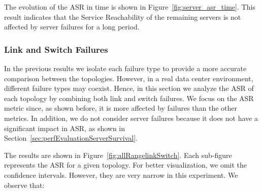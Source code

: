 The evolution of the ASR in time is shown in Figure~\ref{fig:server_asr_time}. This result indicates that the Service Reachability of the remaining servers is not affected by server failures for a long period.

\subsubsection{Link and Switch Failures}
\label{sec:perfEvaluationLinkSwitchSurvival}

In the previous results we isolate each failure type to provide a more accurate comparison between the topologies. However, in a real data center environment, different failure types may coexist.
Hence, in this section we analyze the ASR of each topology by combining both link and switch failures. 
We focus on the ASR metric since, as shown before, it is more affected by failures than the other metrics. In addition, we do not consider server failures because it does not have a significant impact in ASR, as shown in Section~\ref{sec:perfEvaluationServerSurvival}.

The results are shown in Figure~\ref{fig:allRangelinkSwitch}. Each sub-figure represents the ASR for a given topology. For better visualization, we omit the confidence intervals. However, they are very narrow in this experiment. We observe that:

